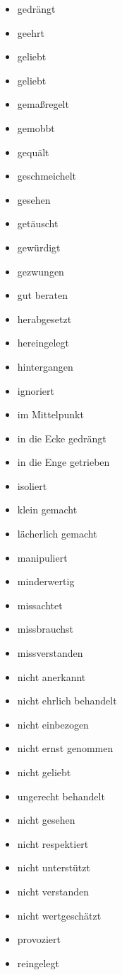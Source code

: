 \begin{multicols}{2}
\begin{itemize}
    \item gedrängt
    \item geehrt
    \item geliebt
    \item geliebt
    \item gemaßregelt
    \item gemobbt
    \item gequält
    \item geschmeichelt
    \item gesehen
    \item getäuscht
    \item gewürdigt
    \item gezwungen
    \item gut beraten
    \item herabgesetzt
    \item hereingelegt
    \item hintergangen
    \item ignoriert
    \item im Mittelpunkt
    \item in die Ecke gedrängt
    \item in die Enge getrieben
    \item isoliert
    \item klein gemacht
    \item lächerlich gemacht
    \item manipuliert
    \item minderwertig
    \item missachtet
    \item missbrauchst
    \item missverstanden
    \item nicht anerkannt
    \item nicht ehrlich behandelt
    \item nicht einbezogen
    \item nicht ernst genommen
    \item nicht geliebt
    \item ungerecht behandelt
    \item nicht gesehen
    \item nicht respektiert
    \item nicht unterstützt
    \item nicht verstanden
    \item nicht wertgeschätzt
    \item provoziert
    \item reingelegt

\end{itemize}
\end{multicols}
